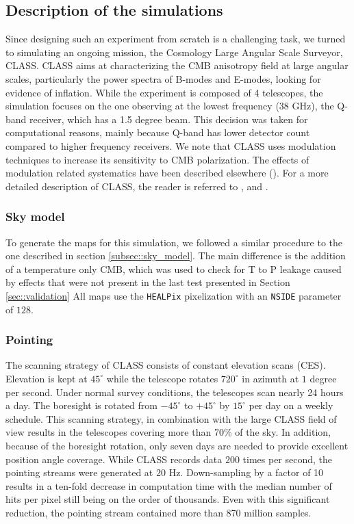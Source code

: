 \documentclass[a4paper,11pt]{article}
\begin{document}
\subsection{Description of the simulations}

Since designing such an experiment from scratch is a challenging task, we turned to simulating an ongoing mission, the Cosmology Large Angular Scale Surveyor, CLASS. CLASS aims at characterizing the CMB anisotropy field at large angular scales, particularly the power spectra of B-modes and E-modes, looking for evidence of inflation. While the experiment is composed of 4 telescopes, the simulation focuses on the one observing at the lowest frequency (38 GHz), the Q-band receiver, which has a 1.5 degree beam. This decision was taken for computational reasons, mainly because Q-band has lower detector count compared to higher frequency receivers. We note that CLASS uses modulation techniques to increase its sensitivity to CMB polarization. The effects of modulation related systematics have been described elsewhere (\cite{2016ApJ...818..151M}). For a more detailed description of CLASS, the reader is referred to \cite{2016SPIE.9914E..1KH}, \cite{2014SPIE.9153E..1IE} and \cite{2019ApJ...876..126A}.

\subsubsection{Sky model}

To generate the maps for this simulation, we followed a similar procedure to the one described in section \ref{subsec::sky_model}. The main difference is the addition of a temperature only CMB, which was used to check for T to P leakage caused by effects that were not present in the last test presented in Section \ref{sec::validation} All maps use the \texttt{HEALPix} pixelization with an \texttt{NSIDE} parameter of $128$. 

\subsubsection{Pointing}

The scanning strategy of CLASS consists of constant elevation scans (CES). Elevation is kept at $45^{\circ}$ while the telescope rotates $720^\circ$ in azimuth at $1$ degree per second. Under normal survey conditions, the telescopes scan nearly 24 hours a day. The boresight is rotated from $-45^{\circ}$ to $+45^{\circ}$ by $15^{\circ}$ per day on a weekly schedule. This scanning strategy, in combination with the large CLASS field of view results in the telescopes covering more than 70$\%$ of the sky. In addition, because of the boresight rotation, only seven days are needed to provide excellent position angle coverage. While CLASS records data $200$ times per second, the pointing streams were generated at $20$ Hz. Down-sampling by a factor of 10 results in a ten-fold decrease in computation time with the median number of hits per pixel still being on the order of thousands. Even with this significant reduction, the pointing stream contained more than 870 million samples.
\end{document}
